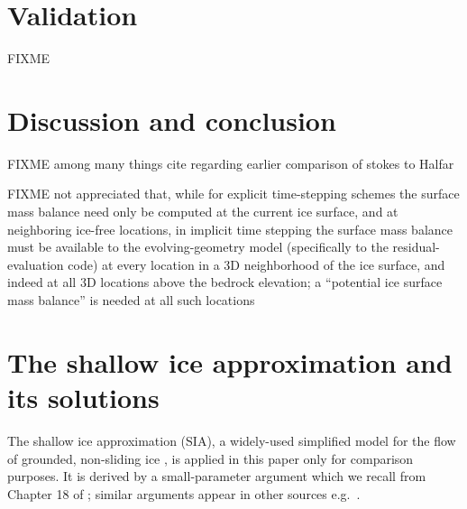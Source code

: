 \documentclass[letterpaper,final,12pt,reqno]{amsart}
\begin{document}
\section{Validation} \label{sec:validation}

FIXME


\section{Discussion and conclusion} \label{sec:discussion}

FIXME among many things cite \cite{LeysingerGudmundsson2004} regarding earlier comparison of stokes to Halfar

FIXME not appreciated that, while for explicit time-stepping schemes the surface mass balance need only be computed at the current ice surface, and at neighboring ice-free locations, in implicit time stepping the surface mass balance must be available to the evolving-geometry model (specifically to the residual-evaluation code) at every location in a 3D neighborhood of the ice surface, and indeed at all 3D locations above the bedrock elevation; a ``potential ice surface mass balance'' is needed at all such locations

\appendix
\section{The shallow ice approximation and its solutions}

The shallow ice approximation (SIA), a widely-used simplified model for the flow of grounded, non-sliding ice \cite{SchoofHewitt2013}, is applied in this paper only for comparison purposes.  It is derived by a small-parameter argument which we recall from Chapter 18 of \cite{Fowler1997}; similar arguments appear in other sources e.g.~\cite{GreveBlatter2009}.
\end{document}
